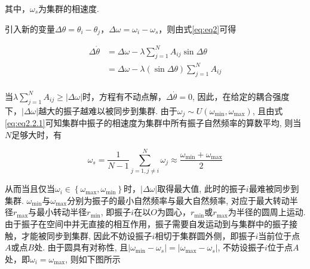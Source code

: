 \documentclass{article}
\begin{document}
其中，$\omega _s$为集群的相速度.

引入新的变量$\Delta \theta =\theta _i-\theta _j$，$\Delta \omega =\omega _i-\omega _s$，则由式\ref{eq:eq2}可得

\begin{equation}\label{eq:eq3}
	\begin{aligned}
		\Delta \dot{\theta}&=\Delta \omega -\lambda \sum_{j=1}^N{A_{ij}\sin \Delta \theta}\\
		&=\Delta \omega -\lambda \left( \sin \Delta \theta \right) \sum_{j=1}^N{A_{ij}}\\
	\end{aligned}
\end{equation}

当$\lambda \sum_{j=1}^N{A_{ij}}\geqslant \left| \Delta \omega \right|$时，方程有不动点解，$\Delta \dot{\theta}=0$, 因此，在给定的耦合强度下，$\left| \Delta \omega \right|$越大的振子越难以被同步到集群. 由于$\omega _j\sim U\left( \omega _{\min}, \omega _{\max} \right) $, 且由式\ref{eq:eq2.2.1}可知集群中振子的相速度为集群中所有振子自然频率的算数平均, 则当$N$足够大时，有

$$
\omega _s=\frac{1}{N-1}\sum_{j=1,j\ne i}^N{\omega _j}\approx \frac{\omega _{\min}+\omega _{\max}}{2}
$$

从而当且仅当$\omega _i\in \left\{ \omega _{\max},\omega _{\min} \right\}$时，$\left| \Delta \omega \right|$取得最大值, 此时的振子$i$最难被同步到集群. 
$\omega _{\min}$与$\omega _{\max}$分别为振子的最小自然频率与最大自然频率, 对应于最大转动半径$r_{\max}$与最小转动半径$r_{\min}$, 即振子$i$在以$O$为圆心，$r_{\min}$或$r_{\max}$为半径的圆周上运动. 
由于振子在空间中并无直接的相互作用，振子需要自发运动到与集群中的振子接触，才能被同步到集群, 因此不妨设振子$i$相切于集群圆外侧，即振子$i$当前位于点$A$或点$B$处.
由于圆具有对称性, 且$\left| \omega _{\min}-\omega _s \right|=\left| \omega _{\max}-\omega _s \right|$, 不妨设振子$i$位于点$A$处，即$\omega_i=\omega_{\max}$, 则如下图所示
\end{document}

